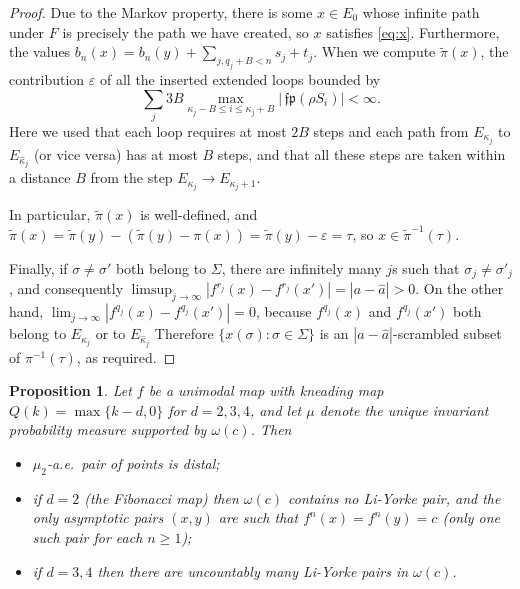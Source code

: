 \documentclass[12pt, psamsfonts, reqno]{amsart}
\newtheorem{proposition}[theorem]{Proposition}
\begin{document}
\begin{proof}
Due to the Markov property, there is some $x \in E_0$ whose infinite path
under $F$ is precisely the path we have created, so $x$ satisfies \eqref{eq:x}.
Furthermore, the values $b_n(x) = b_n(y) + \sum_{j, q_j + B < n} s_j + t_j$.
When we compute $\tilde \pi(x)$, the contribution ${\varepsilon}$ of all the inserted
extended loops bounded by
$$
\sum_j 3B \max_{\kappa_j - B \leq i \leq \kappa_j+B} |{\,\mathfrak{fp}}(\rho S_i)| < \infty.
$$
Here we used that each loop requires at most $2B$ steps
and each path from $E_{\kappa_j}$ to $E_{\hat \kappa_j}$ (or vice versa)
has at most
$B$ steps, and that all these steps are taken within a distance
$B$ from the step $E_{\kappa_j} \to E_{\kappa_j+1}$.

In particular, $\tilde \pi(x)$ is well-defined, and
$\tilde \pi(x) = \tilde \pi(y) - (\tilde \pi(y) - \pi(x)) = \tilde \pi(y) - {\varepsilon} = \tau$, so $x \in \tilde \pi^{-1}(\tau)$.

Finally, if $\sigma \neq \sigma'$ both belong to $\Sigma$, there are infinitely many
$j$s such that $\sigma_j \neq \sigma'_j$, and consequently
$\limsup_{j\to\infty} | f^{r_j}(x) - f^{r_j}(x') |
= |a - \hat a| > 0$.
On the other hand, $\lim_{j\to\infty} | f^{q_j}(x) - f^{q_j}(x') | = 0$,
because  $f^{q_j}(x)$ and $f^{q_j}(x')$ both belong to $E_{\kappa_j}$ or to
 $E_{\hat \kappa_j}$
Therefore $\{ x(\sigma) : \sigma \in \Sigma \}$ is an
$|a - \hat a|$-scrambled subset of $\pi^{-1}(\tau)$, as required.
\end{proof}

\begin{proposition}\label{propFibo1}
Let $f$ be a unimodal map with kneading map $Q(k) = \max\{ k-d, 0
\}$ for $d = 2, 3, 4$, and let $\mu$ denote the unique
invariant probability measure supported by $\omega(c)$. Then
\begin{itemize}
\item $\mu_2$-a.e.\ pair of points is distal;
\item if $d = 2$ (the Fibonacci map) then
$\omega(c)$ contains no Li-Yorke pair, and the only asymptotic
pairs $(x,y)$ are such that $f^n(x) = f^n(y) = c$ (only one such pair for
each $n \ge 1$);
\item if $d = 3,4$ then there are uncountably many Li-Yorke pairs in $\omega(c)$.
\end{itemize}
\end{proposition}
\end{document}
